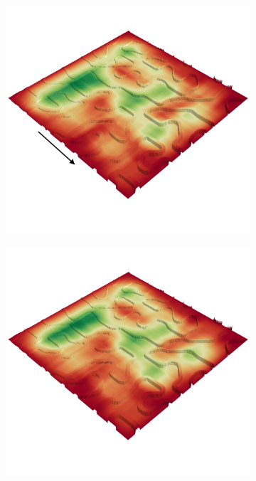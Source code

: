 \documentclass[../document.tex]{subfiles}
\begin{document}
\begin{figure} [htbp]
\begin{subfigure}[b]{0.45\textwidth}
  \end{subfigure}
  \begin{subfigure}[b]{0.45\textwidth}
    \includegraphics[width=\linewidth]{../img/4/traversability/bars/-0.png}
  \end{subfigure}
  \begin{subfigure}[b]{0.45\textwidth}
      \includegraphics[width=\linewidth]{../img/4/traversability/bars/-180.png}  

\end{subfigure}
\end{figure}
\end{document}

